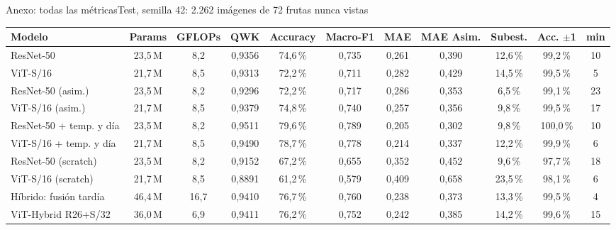 \documentclass[aspectratio=169,11pt,table]{beamer}
\begin{document}
{
\begin{frame}[plain]
  \vfill
  \vfill
\end{frame}
}

\begin{frame}{Anexo: todas las métricas}{Test, semilla 42: 2.262 imágenes de 72 frutas nunca vistas}
{\tiny
\centering
\begin{tabular}{lcccccccccc}
\toprule
\rowcolor{verdeosc}\color{white}\bfseries Modelo & \color{white}\bfseries Params & \color{white}\bfseries GFLOPs & \color{white}\bfseries QWK & \color{white}\bfseries Accuracy & \color{white}\bfseries Macro-F1 & \color{white}\bfseries MAE & \color{white}\bfseries MAE Asim. & \color{white}\bfseries Subest. & \color{white}\bfseries Acc. $\pm$1 & \color{white}\bfseries min \\
\midrule
ResNet-50 & 23{,}5\,M & 8{,}2 & 0{,}9356 & 74{,}6\,\% & 0{,}735 & 0{,}261 & 0{,}390 & 12{,}6\,\% & 99{,}2\,\% & 10 \\
ViT-S/16 & 21{,}7\,M & 8{,}5 & 0{,}9313 & 72{,}2\,\% & 0{,}711 & 0{,}282 & 0{,}429 & 14{,}5\,\% & 99{,}5\,\% & 5 \\
ResNet-50 (asim.) & 23{,}5\,M & 8{,}2 & 0{,}9296 & 72{,}2\,\% & 0{,}717 & 0{,}286 & 0{,}353 & 6{,}5\,\% & 99{,}1\,\% & 23 \\
ViT-S/16 (asim.) & 21{,}7\,M & 8{,}5 & 0{,}9379 & 74{,}8\,\% & 0{,}740 & 0{,}257 & 0{,}356 & 9{,}8\,\% & 99{,}5\,\% & 17 \\
ResNet-50 + temp. y día & 23{,}5\,M & 8{,}2 & 0{,}9511 & 79{,}6\,\% & 0{,}789 & 0{,}205 & 0{,}302 & 9{,}8\,\% & 100{,}0\,\% & 10 \\
ViT-S/16 + temp. y día & 21{,}7\,M & 8{,}5 & 0{,}9490 & 78{,}7\,\% & 0{,}778 & 0{,}214 & 0{,}337 & 12{,}2\,\% & 99{,}9\,\% & 6 \\
ResNet-50 (scratch) & 23{,}5\,M & 8{,}2 & 0{,}9152 & 67{,}2\,\% & 0{,}655 & 0{,}352 & 0{,}452 & 9{,}6\,\% & 97{,}7\,\% & 18 \\
ViT-S/16 (scratch) & 21{,}7\,M & 8{,}5 & 0{,}8891 & 61{,}2\,\% & 0{,}579 & 0{,}409 & 0{,}658 & 23{,}5\,\% & 98{,}1\,\% & 6 \\
Híbrido: fusión tardía & 46{,}4\,M & 16{,}7 & 0{,}9410 & 76{,}7\,\% & 0{,}760 & 0{,}238 & 0{,}373 & 13{,}3\,\% & 99{,}5\,\% & 4 \\
ViT-Hybrid R26+S/32 & 36{,}0\,M & 6{,}9 & 0{,}9411 & 76{,}2\,\% & 0{,}752 & 0{,}242 & 0{,}385 & 14{,}2\,\% & 99{,}6\,\% & 15 \\

\end{tabular}}
\end{frame}
\end{document}
